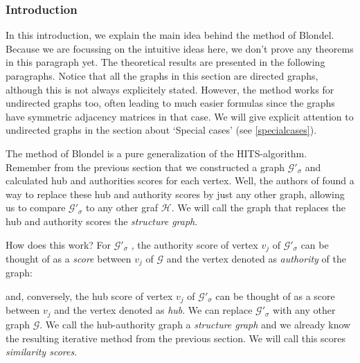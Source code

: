 \documentclass[a4paper,11pt]{report}
\newcommand{\graf}{\mathscr{G}}
\newcommand{\grafeen}{\mathscr{H}}
\begin{document}
\subsubsection{Introduction}
In this introduction, we explain the main idea behind the method of Blondel. Because we are focussing on the intuitive ideas here, 
we don't prove any theorems in this paragraph yet. The theoretical results are 
presented in the following paragraphs. Notice that all the graphs in this 
section are directed graphs, although this is not always explicitely stated. 
However, the method works for undirected graphs too, often leading to much 
easier formulas since the graphs have symmetric adjacency matrices 
in that case. We will give explicit attention to undirected graphs in the 
section about `Special cases' (see \ref{specialcases}).

The method of Blondel is a pure 
generalization of the HITS-algorithm. Remember from the previous section that we 
constructed a graph $\graf'_\sigma$ and calculated hub and authorities scores 
for each vertex. Well, the authors of \cite{blondel} found a way to replace these hub and authority 
scores by just any other graph, allowing us to compare $\graf'_\sigma$ to any other 
graf $\grafeen$. We will call the graph that replaces the hub and authority 
scores the \textit{structure graph}.


How does this work? For $\graf'_\sigma$ , the authority score of vertex $v_j$ of $\graf'_\sigma$  can be thought of as a \emph{score} between $v_j$ of $\graf$ 
and the vertex denoted as \emph{authority} of the graph:

\begin{center}
\end{center}
and, conversely, the hub score of vertex $v_j$ of $\graf'_\sigma$  can be thought of as a 
score between $v_j$ and the vertex denoted as \emph{hub}. We can replace $\graf'_\sigma$  with any other graph
$\graf$. We call the hub-authority graph a 
\emph{structure graph} and we already know the resulting iterative method from the previous section. 
We will call this scores \emph{similarity scores}.
\end{document}
